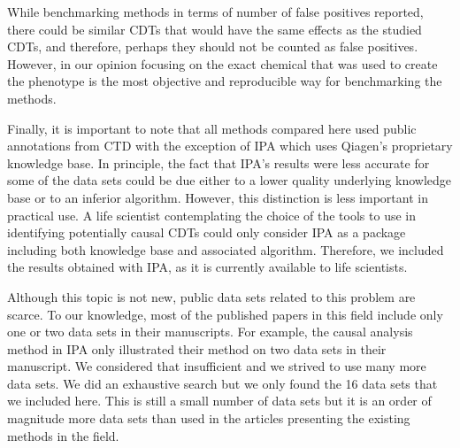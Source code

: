 \documentclass[Minh_PhD_thesis.tex]{subfiles}
\begin{document}

While benchmarking methods in terms of number of false positives reported, there could be similar CDTs that would have the same effects as the studied CDTs, and therefore, perhaps they should not be counted as false positives. However, in our opinion focusing on the exact chemical that was used to create the phenotype is the most objective and reproducible way for benchmarking the methods.

Finally, it is important to note that all methods compared here used public annotations from CTD with the exception of IPA which uses Qiagen's proprietary knowledge base. In principle, the fact that IPA's results were less accurate for some of the data sets could be due either to a lower quality underlying knowledge base or to an inferior algorithm. However, this distinction is less important in practical use. A life scientist contemplating the choice of the tools to use in identifying potentially causal CDTs could only consider IPA as a package including both knowledge base and associated algorithm. Therefore, we included the results obtained with IPA, as it is currently available to life scientists. 

Although this topic is not new, public data sets related to this problem are scarce. To our knowledge, most of the published papers in this field include only one or two data sets in their manuscripts. For example, the causal analysis method in IPA only illustrated their method on two data sets in their manuscript. We considered that insufficient and we strived to use many more data sets. We did an exhaustive search but we only found the 16 data sets that we included here. This is still a small number of data sets but it is an order of magnitude more data sets than used in the articles presenting the existing methods in the field.
\end{document}
